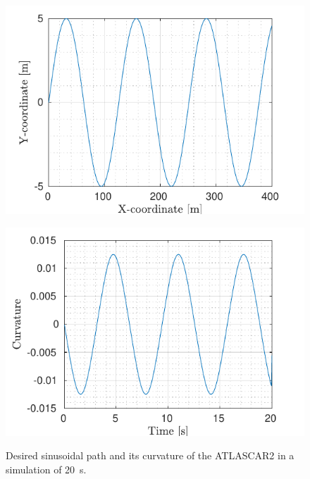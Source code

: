 \begin{figure}[!h]
	\begin{minipage}[t]{0.5\textwidth}
		\includegraphics[width=\textwidth]{../../MATLAB/lane_following/figure/Reference.pdf}
		\subcaption{}
		\label{fig:reference_laneFollowing}
	\end{minipage}
	\begin{minipage}[t]{0.5\textwidth}
		\includegraphics[width=\textwidth]{../../MATLAB/lane_following/figure/Curvature.pdf}
		\subcaption{}
		\label{fig:curvature_laneFollowing}
	\end{minipage}
	\caption{Desired sinusoidal path and its curvature of the ATLASCAR2 in a simulation of \SI{20}{s}.}
	\label{fig:laneFollowing_desired}
\end{figure}

